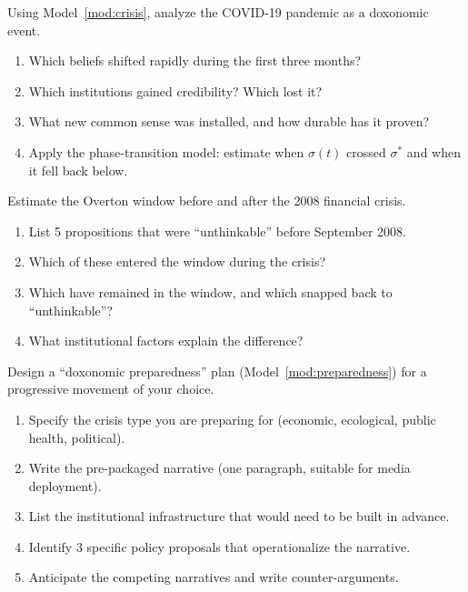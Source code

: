 \begin{exercise}
Using Model~\ref{mod:crisis}, analyze the COVID-19 pandemic as a doxonomic event.
\begin{enumerate}[nosep]
  \item Which beliefs shifted rapidly during the first three months?
  \item Which institutions gained credibility? Which lost it?
  \item What new common sense was installed, and how durable has it proven?
  \item Apply the phase-transition model: estimate when $\sigma(t)$ crossed $\sigma^*$ and when it fell back below.
\end{enumerate}
\end{exercise}

\begin{exercise}
Estimate the Overton window before and after the 2008 financial crisis.
\begin{enumerate}[nosep]
  \item List 5 propositions that were ``unthinkable'' before September 2008.
  \item Which of these entered the window during the crisis?
  \item Which have remained in the window, and which snapped back to ``unthinkable''?
  \item What institutional factors explain the difference?
\end{enumerate}
\end{exercise}

\begin{exercise}
Design a ``doxonomic preparedness'' plan (Model~\ref{mod:preparedness}) for a progressive movement of your choice.
\begin{enumerate}[nosep]
  \item Specify the crisis type you are preparing for (economic, ecological, public health, political).
  \item Write the pre-packaged narrative (one paragraph, suitable for media deployment).
  \item List the institutional infrastructure that would need to be built in advance.
  \item Identify 3 specific policy proposals that operationalize the narrative.
  \item Anticipate the competing narratives and write counter-arguments.
\end{enumerate}
\end{exercise}

